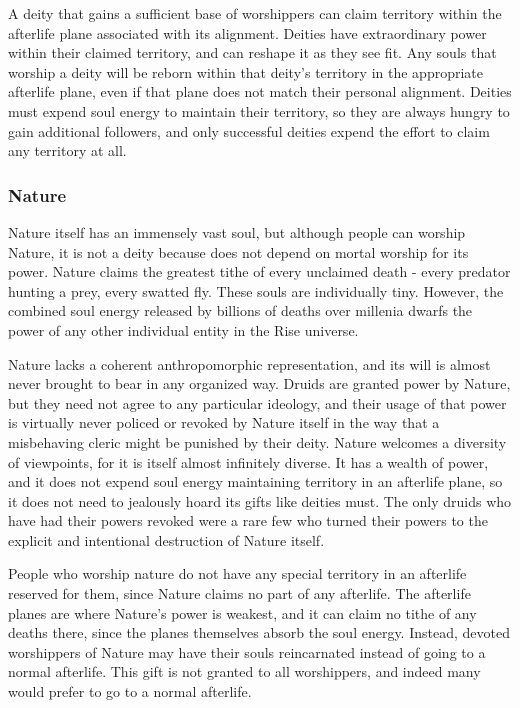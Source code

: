             A deity that gains a sufficient base of worshippers can claim territory within the afterlife plane associated with its alignment.
            Deities have extraordinary power within their claimed territory, and can reshape it as they see fit.
            Any souls that worship a deity will be reborn within that deity's territory in the appropriate afterlife plane, even if that plane does not match their personal alignment.
            Deities must expend soul energy to maintain their territory, so they are always hungry to gain additional followers, and only successful deities expend the effort to claim any territory at all.

        \subsubsection{Nature}
            Nature itself has an immensely vast soul, but although people can worship Nature, it is not a deity because does not depend on mortal worship for its power.
            Nature claims the greatest tithe of every unclaimed death - every predator hunting a prey, every swatted fly.
            These souls are individually tiny.
            However, the combined soul energy released by billions of deaths over millenia dwarfs the power of any other individual entity in the Rise universe.

            Nature lacks a coherent anthropomorphic representation, and its will is almost never brought to bear in any organized way.
            Druids are granted power by Nature, but they need not agree to any particular ideology, and their usage of that power is virtually never policed or revoked by Nature itself in the way that a misbehaving cleric might be punished by their deity.
            Nature welcomes a diversity of viewpoints, for it is itself almost infinitely diverse.
            It has a wealth of power, and it does not expend soul energy maintaining territory in an afterlife plane, so it does not need to jealously hoard its gifts like deities must.
            The only druids who have had their powers revoked were a rare few who turned their powers to the explicit and intentional destruction of Nature itself.

            People who worship nature do not have any special territory in an afterlife reserved for them, since Nature claims no part of any afterlife.
            The afterlife planes are where Nature's power is weakest, and it can claim no tithe of any deaths there, since the planes themselves absorb the soul energy.
            Instead, devoted worshippers of Nature may have their souls reincarnated instead of going to a normal afterlife.
            This gift is not granted to all worshippers, and indeed many would prefer to go to a normal afterlife.

